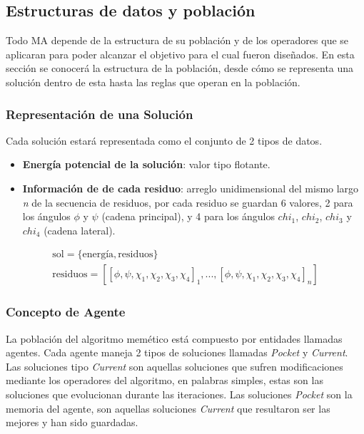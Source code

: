\subsection{Estructuras de datos y población}
Todo MA depende de la estructura de su población y de los operadores que se aplicaran para poder alcanzar el objetivo para el cual fueron diseñados. En esta sección se conocerá la estructura de la población, desde cómo se representa una solución dentro de esta hasta las reglas que operan en la población.

\subsubsection{Representación de una Solución}
Cada solución estará representada como el conjunto de 2 tipos de datos.
\begin{itemize}
	\item \textbf{Energía potencial de la solución}: valor tipo flotante.
	\item \textbf{Información de de cada residuo}: arreglo unidimensional del mismo largo \textit{n} de la secuencia de residuos, por cada residuo se guardan 6 valores, 2 para los ángulos $\phi$ y $\psi$ (cadena principal), y 4 para los ángulos $chi_{1}$, $chi_{2}$, $chi_{3}$ y $chi_{4}$ (cadena lateral).
\end{itemize}

\begin{equation*} 
    \begin{split} 
        \text{sol} = \{\text{energía},\text{residuos}\} \\
        \text{residuos} = [[\phi,\psi,\chi_1,\chi_2,\chi_3,\chi_4]_1,...,[\phi,\psi,\chi_1,\chi_2,\chi_3,\chi_4]_n]
    \end{split} 
\end{equation*}

\subsubsection{Concepto de Agente}
La población del algoritmo memético está compuesto por entidades llamadas agentes. Cada agente maneja 2 tipos de soluciones llamadas \textit{Pocket} y \textit{Current}. Las soluciones tipo \textit{Current} son aquellas soluciones que sufren modificaciones mediante los operadores del algoritmo, en palabras simples, estas son las soluciones que evolucionan durante las iteraciones. Las soluciones \textit{Pocket} son la memoria del agente, son aquellas soluciones \textit{Current} que resultaron ser las mejores y han sido guardadas.

